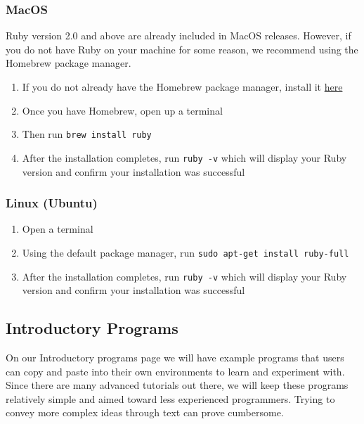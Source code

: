 \documentclass{article}
\begin{document}
  \subsubsection{MacOS}
    Ruby version 2.0 and above are already included in MacOS releases. However, if you do not have Ruby on your machine for some reason, we recommend using the Homebrew package manager.
    \begin{enumerate}
      \item If you do not already have the Homebrew package manager, install it \href{https://brew.sh/}{here}
      \item Once you have Homebrew, open up a terminal
      \item Then run \verb|brew install ruby|
      \item After the installation completes, run \verb|ruby -v| which will display your Ruby version and confirm your installation was successful
    \end{enumerate}

  \subsubsection{Linux (Ubuntu)}
    \begin{enumerate}
      \item Open a terminal
      \item Using the default package manager, run \verb|sudo apt-get install ruby-full|
      \item After the installation completes, run \verb|ruby -v| which will display your Ruby version and confirm your installation was successful
    \end{enumerate}

\subsection{Introductory Programs}
  On our Introductory programs page we will have example programs that users can copy and paste into their own environments to learn and experiment with.
  Since there are many advanced tutorials out there, we will keep these programs relatively simple and aimed toward less experienced programmers. Trying to convey more complex
  ideas through text can prove cumbersome.
  \newline
  \newline
\end{document}
